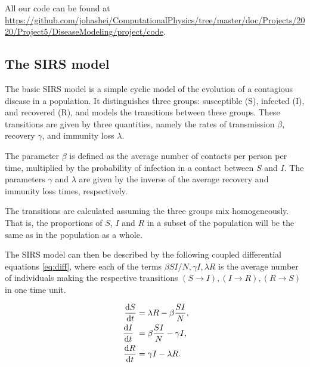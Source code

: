 \documentclass[a4paper,10pt,twocolumn]{article}
\begin{document}
All our code can be found at \url{https://github.com/johashei/ComputationalPhysics/tree/master/doc/Projects/2020/Project5/DiseaseModeling/project/code}.


\subsection{The SIRS model}
The basic SIRS model is a simple cyclic model of the evolution of a contagious disease in a population. It distinguishes three groups: susceptible (S), infected (I), and recovered (R), and models the transitions between these groups. 
These transitions are given by three quantities, namely the rates of transmission $\beta$, recovery $\gamma$, and immunity  loss $\lambda$. 

The parameter $\beta$ is defined as the average number of contacts per person per time, multiplied by the probability of infection in a contact between $S$ and $I$.
The parameters $\gamma$ and $\lambda$ are given by the inverse of the average recovery and immunity loss times, respectively.

The transitions are calculated assuming the three groups mix homogeneously. That is, the proportions of $S$, $I$ and $R$ in a subset of the population will be the same as in the population as a whole.  



The SIRS model can then be described by the following coupled differential equations \ref{eq:diff}, where each of the terms $\beta SI/N, \gamma I, \lambda R$ is the average number of individuals making the respective transitions $(S\to I), (I\to R), (R\to S)$ in one time unit.

\begin{subequations}\label{eq:diff}
\begin{align}
\dv{S}{t} &= \lambda R - \beta\frac{SI}{N},
\\ \dv{I}{t} &= \beta\frac{SI}{N} - \gamma I,
\\ \dv{R}{t} &= \gamma I - \lambda R.
\end{align} 
\end{subequations}
\end{document}
